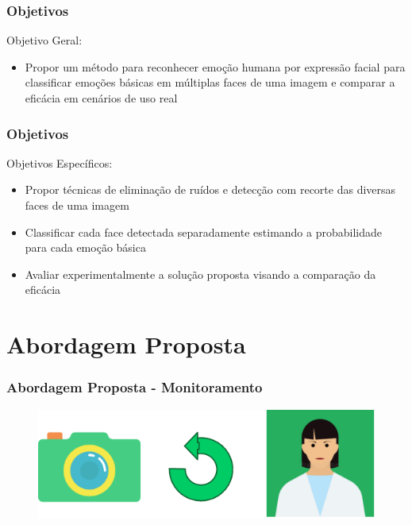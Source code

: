 \documentclass{beamer}
\begin{document}
\begin{frame}
\frametitle{Objetivos}
\begin{block}{Objetivo Geral:}
\begin{itemize}
\pause
\item Propor um método para reconhecer emoção humana por expressão facial para classificar emoções básicas em múltiplas faces de uma imagem e comparar a eficácia em cenários de uso real
\end{itemize}
\end{block}


\frametitle{Objetivos}
\begin{block}{Objetivos Específicos:}
\begin{itemize}
\pause
 \item Propor técnicas de eliminação de ruídos e detecção com recorte das diversas faces de uma imagem
 \pause
 \item Classificar cada face detectada separadamente estimando a probabilidade para cada emoção básica
 \pause
 \item Avaliar experimentalmente a solução proposta visando a comparação da eficácia
\end{itemize}
\end{block}
\end{frame}



\section{Abordagem Proposta}



\begin{frame}
\frametitle{Abordagem Proposta - Monitoramento }
\begin{figure}
\centering
\includegraphics[scale=0.37]{figuras/monitoramento_1.png}
\label{fig:arquitetura1}
\end{figure}
\end{frame}
\end{document}
